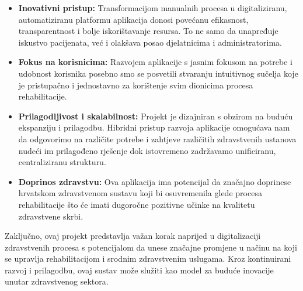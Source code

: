         \begin{itemize}
            \item \textbf{Inovativni pristup:} Transformacijom manualnih procesa u digitaliziranu, automatiziranu platformu aplikacija donosi povećanu efikasnost, transparentnost i bolje iskorištavanje resursa. To ne samo da unapređuje iskustvo pacijenata, već i olakšava posao djelatnicima i administratorima.
            
            \item \textbf{Fokus na korisnicima:} Razvojem aplikacije s jasnim fokusom na potrebe i udobnost korisnika posebno smo se posvetili stvaranju intuitivnog sučelja koje je pristupačno i jednostavno za korištenje svim dionicima procesa rehabilitacije.
        
            \item \textbf{Prilagodljivost i skalabilnost:} Projekt je dizajniran s obzirom na buduću ekspanziju i prilagodbu. Hibridni pristup razvoja aplikacije omogućava nam da odgovorimo na različite potrebe i zahtjeve različitih zdravstvenih ustanova nudeći im prilagođeno rješenje dok istovremeno zadržavamo unificiranu, centraliziranu strukturu.
        
            \item \textbf{Doprinos zdravstvu:} Ova aplikacija ima potencijal da značajno doprinese hrvatskom zdravstvenom sustavu koji bi osuvremenila glede procesa rehabilitacije što će imati dugoročne pozitivne učinke na kvalitetu zdravstvene skrbi.
        \end{itemize}
        
        Zaključno, ovaj projekt predstavlja važan korak naprijed u digitalizaciji zdravstvenih procesa s potencijalom da unese značajne promjene u načinu na koji se upravlja rehabilitacijom i srodnim zdravstvenim uslugama. Kroz kontinuirani razvoj i prilagodbu, ovaj sustav može služiti kao model za buduće inovacije unutar zdravstvenog sektora.
        
		
		\eject
		
	

